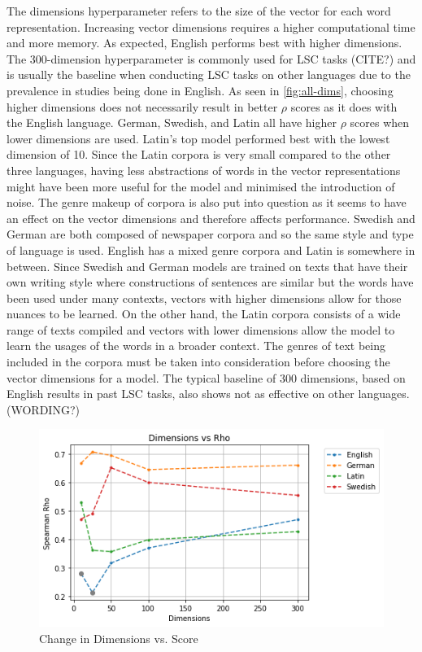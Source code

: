 The dimensions hyperparameter refers to the size of the vector for each word representation. Increasing vector dimensions requires a higher computational time and more memory. As expected, English performs best with higher dimensions. The 300-dimension hyperparameter is commonly used for LSC tasks (CITE?) and is usually the baseline when conducting LSC tasks on other languages due to the prevalence in studies being done in English. As seen in \autoref{fig:all-dims}, choosing higher dimensions does not necessarily result in better $\rho$ scores as it does with the English language. German, Swedish, and Latin all have higher $\rho$ scores when lower dimensions are used. Latin’s top model performed best with the lowest dimension of 10. Since the Latin corpora is very small compared to the other three languages, having less abstractions of words in the vector representations might have been more useful for the model and minimised the introduction of noise. The genre makeup of corpora is also put into question as it seems to have an effect on the vector dimensions and therefore affects performance. Swedish and German are both composed of newspaper corpora and so the same style and type of language is used. English has a mixed genre corpora and Latin is somewhere in between. Since Swedish and German models are trained on texts that have their own writing style where constructions of sentences are similar but the words have been used under many contexts, vectors with higher dimensions allow for those nuances to be learned. On the other hand, the Latin corpora consists of a wide range of texts compiled and vectors with lower dimensions allow the model to learn the usages of the words in a broader context. The genres of text being included in the corpora must be taken into consideration before choosing the vector dimensions for a model. The typical baseline of 300 dimensions, based on English results in past LSC tasks, also shows not as effective on other languages. (WORDING?)

\begin{figure}[h]
  \centering
  \includegraphics[width=.8\linewidth]{sections/figures/dims_all.png}
  \caption{Change in Dimensions vs. Score}
  \label{fig:all-dims}
\end{figure}

